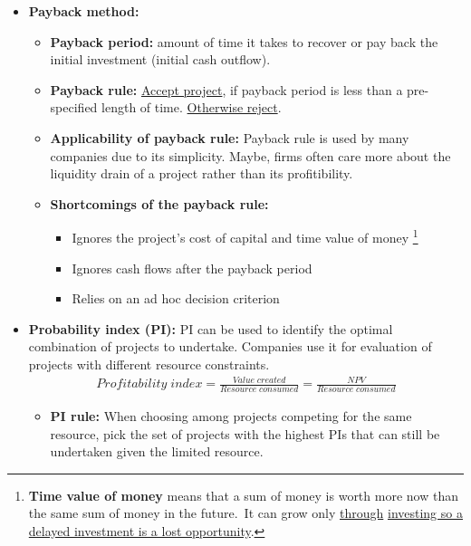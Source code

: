 \documentclass[ieeetran]{article}
\begin{document}
\begin{itemize}
\item \textbf{Payback method:}
	\begin{itemize}
	 \item \textbf{Payback period:} amount of time it takes to recover or pay back the initial investment (initial cash outflow).
\item \textbf{Payback rule:} \underline{Accept project}, if payback period is less than a pre-specified length of time. \underline{Otherwise reject}.

\item \textbf{Applicability of payback rule:} Payback rule is used by many companies due to its simplicity. Maybe, firms often care more about the liquidity drain of a project rather than its profitibility.

\item \textbf{Shortcomings of the payback rule:}
	\begin{itemize}
		\item Ignores the project's cost of capital and time value of money
			\footnote{\textbf{Time value of money} means that a sum of money is worth more now than the same sum of money in the future.\
			It can grow only \underline{through} \underline{investing so a delayed investment is a lost opportunity}.}
	\item Ignores cash flows after the payback period
	\item Relies on an ad hoc decision criterion
	\end{itemize} 
	\end{itemize}
 
\item \textbf{Probability index (PI):} PI can be used to identify the optimal combination of projects to undertake. Companies use it for evaluation of projects with different resource constraints.
	\large
	\begin{equation*}
	\boxed{
	\begin{aligned}
	Profitability \; index = \frac{Value \; created}{Resource \; consumed} = \frac{NPV}{Resource \; consumed}
	\end{aligned}
	}
	\end{equation*}
	\normalsize
\begin{itemize}
	\item \textbf{PI rule:} When choosing among projects competing for the same resource, pick the set of projects with the highest PIs that can still be undertaken given the limited resource.


\end{itemize}
\end{itemize}
\end{document}
